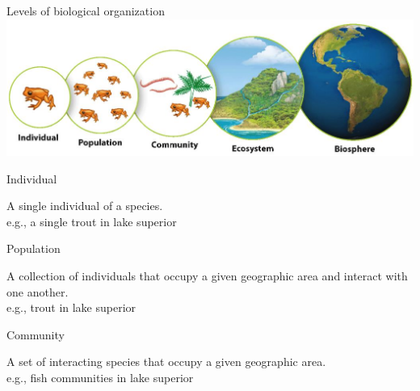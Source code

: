 \documentclass[12pt]{beamer}
\begin{document}


\begin{frame}

  \textcolor{boss5}{Levels of biological organization}\\
  \includegraphics[width=\textwidth]{figs/ecologicalOrganization.png}
\end{frame}



\begin{frame}

	\begin{flushright}
	  \Large \textcolor{boss2}{Individual} 
	\end{flushright}

A single individual of a species.  \\

e.g., a single trout in lake superior
\end{frame}







\begin{frame}

	\begin{flushright}
	  \Large \textcolor{boss2}{Population} 
	\end{flushright}

A collection of individuals that occupy a given geographic area and interact with one another.\\

e.g., trout in lake superior
\end{frame}









\begin{frame}

	\begin{flushright}
	  \Large \textcolor{boss2}{Community} 
	\end{flushright}

A set of interacting species that occupy a given geographic area.\\

e.g., fish communities in lake superior
\end{frame}
\end{document}
